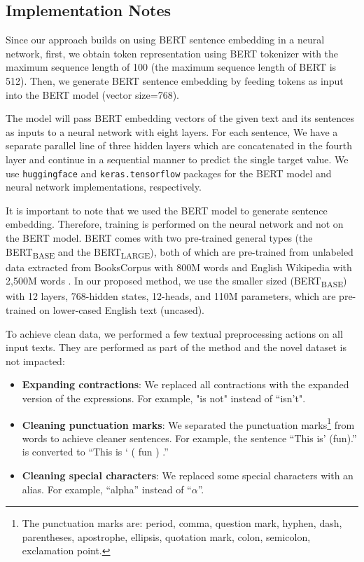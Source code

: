 \documentclass{article}
\begin{document}
\subsection{Implementation Notes}
\label{sec:impl}
Since our approach builds on using BERT sentence embedding in a neural network, first, we obtain token representation using BERT tokenizer with the maximum sequence length of 100 (the maximum sequence length of BERT is 512). Then, we generate BERT sentence embedding by feeding tokens as input into the BERT model (vector size=768). 

The model will pass BERT embedding vectors of the given text and its sentences as inputs to a neural network with eight layers. For each sentence, We have a separate parallel line of three hidden layers which are concatenated in the fourth layer and continue in a sequential manner to predict the single target value. We use \verb+huggingface+ and \verb+keras.tensorflow+ packages for the BERT model and neural network implementations, respectively.

It is important to note that we used the BERT model to generate sentence embedding. Therefore, training is performed on the neural network and not on the BERT model. BERT comes with two pre-trained general types (the BERT\textsubscript{BASE} and the BERT\textsubscript{LARGE}), both of which are pre-trained from unlabeled data extracted from BooksCorpus \cite{zhu2015aligning} with 800M words and English Wikipedia with 2,500M words \cite{devlin2018bert}. In our proposed method, we use the smaller sized (BERT\textsubscript{BASE}) with 12 layers, 768-hidden states, 12-heads, and 110M parameters, which are pre-trained on lower-cased English text (uncased).

To achieve clean data, we performed a few textual preprocessing actions on all input texts. They are performed as part of the method and the novel dataset is not impacted:

\begin{itemize}
    \item \textbf{Expanding contractions}: We replaced all contractions with the expanded version of the expressions. For example, "is not" instead of “isn’t".
    \item \textbf{Cleaning punctuation marks}: We separated the punctuation marks\footnote{The punctuation marks are: period, comma, question mark, hyphen, dash, parentheses, apostrophe, ellipsis, quotation mark, colon, semicolon, exclamation point.} from words to achieve cleaner sentences. For example, the sentence “This is’ (fun).” is converted to “This is ‘ ( fun ) .”
    \item \textbf{Cleaning special characters}: We replaced some special characters with an alias. For example, “alpha” instead of “\( \alpha \)”.
\end{itemize}
\end{document}
